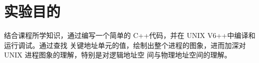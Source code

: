 \section{实验目的}
结合课程所学知识，通过编写一个简单的 C++代码，并在 UNIX V6++中编译和运行调试。通过查找
关键地址单元的值，绘制出整个进程的图象，进而加深对 UNIX 进程图象的理解，特别是对逻辑地址空
间与物理地址空间的理解。 
